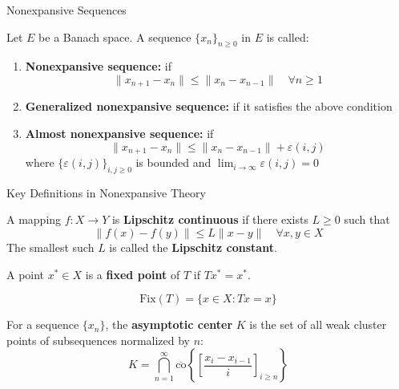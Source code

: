 \documentclass[aspectratio=169,10pt]{beamer}
\begin{document}
\begin{frame}{Nonexpansive Sequences}
    \begin{definition}
        Let $E$ be a Banach space. A sequence $\{x_n\}_{n \geq 0}$ in $E$ is called:

        \begin{enumerate}
            \item \textbf{Nonexpansive sequence:} if
                \[
                \|x_{n+1} - x_n\| \leq \|x_n - x_{n-1}\| \quad \forall n \geq 1
                \]

            \item \textbf{Generalized nonexpansive sequence:} if it satisfies the above condition

            \item \textbf{Almost nonexpansive sequence:} if
                \[
                \|x_{n+1} - x_n\| \leq \|x_n - x_{n-1}\| + \varepsilon(i,j)
                \]
                where $\{\varepsilon(i,j)\}_{i,j \geq 0}$ is bounded and $\lim_{i \to \infty} \varepsilon(i,j) = 0$
        \end{enumerate}
    \end{definition}
\end{frame}

\begin{frame}{Key Definitions in Nonexpansive Theory}
    \begin{definition}
        A mapping $f: X \to Y$ is \textbf{Lipschitz continuous} if there exists $L \geq 0$ such that
        \[
        \|f(x) - f(y)\| \leq L\|x - y\| \quad \forall x, y \in X
        \]
        The smallest such $L$ is called the \textbf{Lipschitz constant}.
    \end{definition}

    \vspace{0.5cm}

    \begin{definition}
        A point $x^* \in X$ is a \textbf{fixed point} of $T$ if $Tx^* = x^*$.

        \[
        \text{Fix}(T) = \{x \in X : Tx = x\}
        \]
    \end{definition}

    \vspace{0.5cm}

    \begin{definition}
        For a sequence $\{x_n\}$, the \textbf{asymptotic center} $K$ is the set of all weak cluster points of subsequences normalized by $n$:
        \[
        K = \bigcap_{n=1}^{\infty} \overline{\text{co}}\left\{\left[\frac{x_i - x_{i-1}}{i}\right]_{i \geq n}\right\}
        \]
    \end{definition}
\end{frame}
\end{document}
